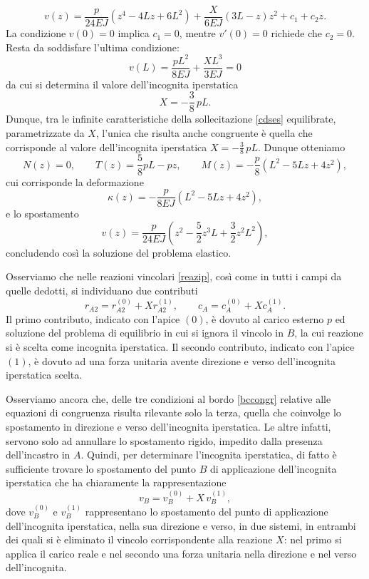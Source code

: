 \begin{equation}
	v(z)=\frac{p}{24 EJ}(z^4-4L z+6L^2)+\frac{X}{6 EJ}(3L-z)z^2+c_1+c_2 z.
\end{equation}
La condizione $v(0)=0$ implica $c_1=0$, mentre  $v'(0)=0$ richiede che $c_2=0$. Resta da soddisfare l'ultima condizione:
\begin{equation}
v(L)=\frac{pL^2}{8EJ}+\frac{XL^3}{3EJ}=0
\end{equation} 
da cui si determina il valore dell'incognita iperstatica
\begin{equation}
X=-\frac{3}{8}\,pL.
\end{equation}
Dunque, tra le infinite caratteristiche della sollecitazione \eqref{cdses} equilibrate, parametrizzate da $X$, l'unica che risulta anche congruente è quella che corrisponde al valore dell'incognita iperstatica $X=-\frac{3}{8}\,pL$.
Dunque otteniamo
 \begin{equation}
	N(z)=0, \qquad  T(z)=\frac{5}{8}p L-pz, \qquad M(z)=-\frac p8 (L^2-5 L z+4 z^2),
\end{equation}
cui corrisponde la deformazione
\begin{equation}
	\kappa(z)=-\frac{p}{8EJ} (L^2-5 L z+4 z^2),
\end{equation}
e lo spostamento
\begin{equation}
v(z)=\frac{p}{24 EJ}\left(z^2-\frac{5}{2}z^3L+\frac{3}{2}z^2L^2  \right),
\end{equation}
concludendo così la soluzione del problema elastico.

Osserviamo che nelle reazioni vincolari \eqref{reazip}, così come in tutti i campi da quelle dedotti, si individuano due contributi
\begin{equation}
r_{A2}=r^{(0)}_{A2}+Xr^{(1)}_{A2}, \qquad c_A=c^{(0)}_A+Xc^{(1)}_A.
\end{equation}
Il primo contributo, indicato con l'apice $(0)$, è dovuto al carico esterno $p$ ed soluzione del problema di equilibrio in cui si ignora il vincolo in $B$, la cui reazione si è scelta come incognita iperstatica. Il secondo contributo,  indicato con l'apice $(1)$, è  dovuto ad una forza unitaria avente direzione e verso dell'incognita iperstatica scelta.

Osserviamo ancora che, delle tre condizioni al bordo \eqref{bccongr} relative alle equazioni di congruenza risulta rilevante solo la terza, quella che coinvolge lo spostamento in direzione e verso dell'incognita iperstatica. Le altre infatti, servono solo ad annullare lo spostamento rigido, impedito dalla presenza dell'incastro in $A$. Quindi, per determinare l'incognita iperstatica, di fatto è sufficiente trovare lo spostamento  del punto $B$ di applicazione dell'incognita iperstatica che ha chiaramente la rappresentazione
\begin{equation}
v_B=v_B^{(0)}+X\,v_B^{(1)},
\end{equation}
dove $v_B^{(0)}$ e $v_B^{(1)}$ rappresentano lo spostamento del punto di applicazione dell'incognita iperstatica, nella sua direzione e  verso, in due sistemi, in entrambi dei quali si è eliminato il vincolo corrispondente alla reazione $X$: nel primo si applica il carico reale e nel secondo una forza unitaria nella direzione e nel verso dell'incognita.

